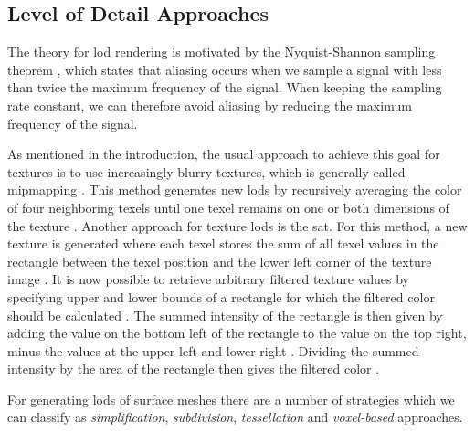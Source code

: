 \subsection{Level of Detail Approaches}
The theory for \ac{lod} rendering is motivated by the Nyquist-Shannon sampling theorem \cite{shannonsampling}, which states that aliasing occurs when we sample a signal with less than twice the maximum frequency of the signal.
When keeping the sampling rate constant, we can therefore avoid aliasing by reducing the maximum frequency of the signal.

As mentioned in the introduction, the usual approach to achieve this goal for textures is to use increasingly blurry textures, which is generally called mipmapping \cite{mipmapping}.
This method generates new \acsp{lod} by recursively averaging the color of four neighboring texels until one texel remains on one or both dimensions of the texture \cite{mipmapping}.
Another approach for texture \acsp{lod} is the \ac{sat}.
For this method, a new texture is generated where each texel stores the sum of all texel values in the rectangle between the texel position and the lower left corner of the texture image \cite{crow_summed_area_tables}.
It is now possible to retrieve arbitrary filtered texture values by specifying upper and lower bounds of a rectangle for which the filtered color should be calculated \cite{crow_summed_area_tables}.
The summed intensity of the rectangle is then given by adding the value on the bottom left of the rectangle to the value on the top right, minus the values at the upper left and lower right \cite{crow_summed_area_tables}.
Dividing the summed intensity by the area of the rectangle then gives the filtered color \cite{crow_summed_area_tables}.

For generating \acsp{lod} of surface meshes there are a number of strategies which we can classify as \textit{simplification}, \textit{subdivision}, \textit{tessellation} and \textit{voxel-based} approaches.

